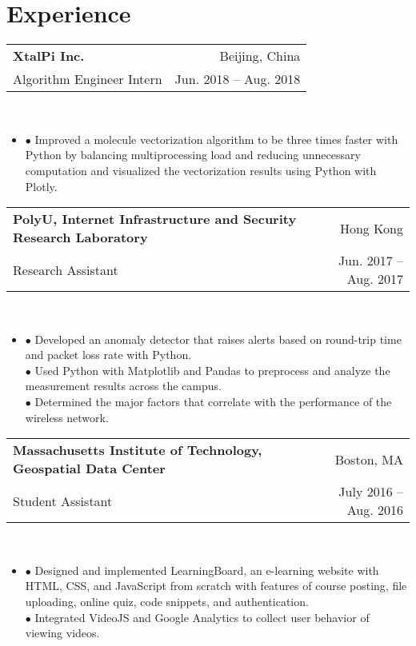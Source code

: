 \documentclass[letterpaper,11pt]{article}
\makeatletter
\newcommand{\tableStart}{
    \begin{tabular*}{0.97\textwidth}{l@{\extracolsep{\fill}}r}
  }
\newcommand{\tableEnd}{
    \end{tabular*}\\
  }
\newcommand{\indentStart}[1][{}]{
    \begin{itemize}[label=#1,leftmargin=*]\vspace{-5pt} \item
  }
\newcommand{\indentEnd}{
    \end{itemize}\vspace{-3pt}
  }
\makeatother
\begin{document}
        \section{Experience}
        \tableStart
        \textbf{\large XtalPi Inc.} & Beijing, China\\
        Algorithm Engineer Intern & Jun. 2018 -- Aug. 2018\\
        \tableEnd
        \indentStart
        $\bullet$ Improved a molecule vectorization algorithm to be three times faster with Python by balancing multiprocessing load and reducing unnecessary computation and visualized the vectorization results using Python with Plotly.
        \indentEnd
        \tableStart
        \textbf{\large PolyU, Internet Infrastructure and Security Research Laboratory} & Hong Kong\\
        Research Assistant & Jun. 2017 -- Aug. 2017\\
        \tableEnd
        \indentStart
        $\bullet$ Developed an anomaly detector that raises alerts based on round-trip time and packet loss rate with Python.\\
        $\bullet$ Used Python with Matplotlib and Pandas to preprocess and analyze the measurement results across the campus.\\
        $\bullet$ Determined the major factors that correlate with the performance of the wireless network.
        \indentEnd
        \tableStart
        \textbf{\large Massachusetts Institute of Technology, Geospatial Data Center} & Boston, MA\\
        Student Assistant & July 2016 -- Aug. 2016\\
        \tableEnd
        \indentStart
        $\bullet$ Designed and implemented LearningBoard, an e-learning website with HTML, CSS, and JavaScript from scratch with features of course posting, file uploading, online quiz, code snippets, and authentication.\\
        $\bullet$ Integrated VideoJS and Google Analytics to collect user behavior of viewing videos.
        \indentEnd
        
\end{document}
